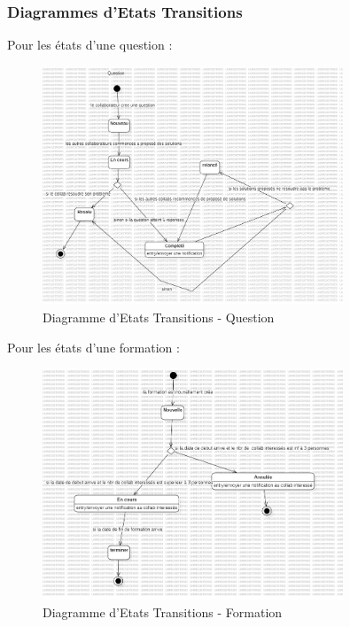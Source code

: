 \documentclass{article}
\begin{document}
            \subsubsection{Diagrammes d'Etats Transitions}
                Pour les états d'une question :
                \begin{figure}[h!]
                    \centering
                    \includegraphics[width=0.8\textwidth]{assets/diagrammes/jpg/StateMachine1!Question_0.jpg}
                    \caption{Diagramme d'Etats Transitions - Question}
                \end{figure}
                \FloatBarrier
                Pour les états d'une formation :
                \begin{figure}[h!]
                    \centering
                    \includegraphics[width=0.8\textwidth]{assets/diagrammes/jpg/StateMachine2!Formation_1.jpg}
                    \caption{Diagramme d'Etats Transitions - Formation}
                \end{figure}
                \FloatBarrier
            
\end{document}
